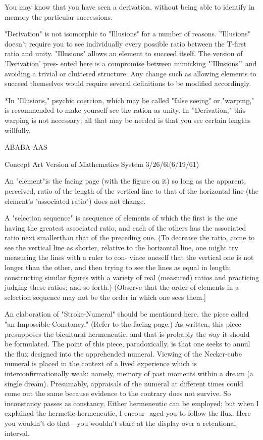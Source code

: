 You may know that you have seen a derivation, without being able to identify in memory the 
particular successions. 


"Derivation" is not isomorphic to "Illusions" for a number of reasons. ''Illusions" doesn't 
require you to see individually every possible ratio between the T-first ratio and unity. 
"Illusions" allows an element to succeed itself. The version of 'Derivation' pres- 
ented here is a compromise between mimicking "'Illusions"' and avoiding a trivial or 
cluttered structure. Any change such as allowing elements to succeed themselves 
would require several definitions to be modified accordingly. 


*In "Illusions," psychic coercion, which may be called "false seeing" or "warping," is 
recommended to make yourself see the ration as unity. In ''Derivation," this warping is not 
necessary; all that may be needed is that you see certain lengths willfully. 


ABABA AAS 


Concept Art Version of Mathematics System 3/26/6l(6/19/61) 

An "element"is the facing page (with the figure on it) so long 
as the apparent, perceived, ratio of the length of the vertical 
line to that of the horizontal line (the element's "associated 
ratio") does not change. 

A "selection sequence" is asequence of elements of which the 
first is the one having the greatest associated ratio, and 
each of the others has the associated ratio next smallerthan 
that of the preceding one. (To decrease the ratio, come to 
see the vertical line as shorter, relative to the horizontal 
line, one might try measuring the lines with a ruler to con- 
vince oneself that the vertical one is not longer than the 
other, and then trying to see the lines as equal in length; 
constructing similar figures with a variety of real (measured) 
ratios and practicing judging these ratios; and so forth.) 
(Observe that the order of elements in a selection sequence 
may not be the order in which one sees them.] 


An elaboration of "Stroke-Numeral" should be mentioned here, 
the piece called "an Impossible Constancy." (Refer to the facing page.) 
As written, this piece presupposes the bicultural hermeneutic, and that 
is probably the way it should be formulated. The point of this piece, 
paradoxically, is that one seeks to annul the flux designed into the 
apprehended numeral. Viewing of the Necker-cube numeral is placed 
in the context of a lived experience which is interconfirmationally 
weak: namely, memory of past moments within a dream (a single 
dream). Presumably, appraisals of the numeral at different times could 
come out the same because evidence to the contrary does not survive. 
So inconstancy passes as constancy. Either hermeneutic can be 
employed; but when I explained the hermetic hermeneutic, I encour- 
aged you to follow the flux. Here you wouldn't do that---you wouldn't 
stare at the display over a retentional interval. 



